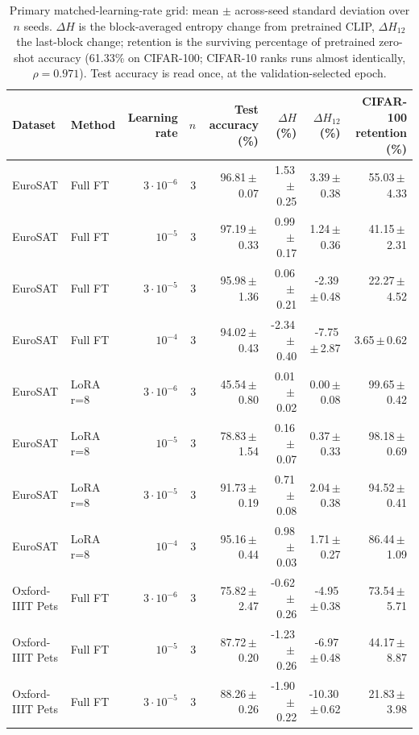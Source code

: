\documentclass[conference]{IEEEtran}
\begin{document}
\begin{table}[!t]
\caption{Primary matched-learning-rate grid: mean $\pm$ across-seed standard deviation over $n$ seeds. $\Delta H$ is the block-averaged entropy change from pretrained CLIP, $\Delta H_{12}$ the last-block change; retention is the surviving percentage of pretrained zero-shot accuracy (61.33\% on CIFAR-100; CIFAR-10 ranks runs almost identically, $\rho=0.971$). Test accuracy is read once, at the validation-selected epoch.}
\label{tab:grid}
\centering
\scriptsize
\setlength{\tabcolsep}{4pt}
\renewcommand{\arraystretch}{0.85}
\begin{tabular}{llrrrrrr}
\toprule
Dataset & Method & Learning rate & $n$ & Test accuracy (\%) & $\Delta H$ (\%) & $\Delta H_{12}$ (\%) & CIFAR-100 retention (\%) \\
\midrule
EuroSAT & Full FT & $3\cdot 10^{-6}$ & 3 & 96.81\,$\pm$\,0.07 & 1.53\,$\pm$\,0.25 & 3.39\,$\pm$\,0.38 & 55.03\,$\pm$\,4.33 \\
EuroSAT & Full FT & $10^{-5}$ & 3 & 97.19\,$\pm$\,0.33 & 0.99\,$\pm$\,0.17 & 1.24\,$\pm$\,0.36 & 41.15\,$\pm$\,2.31 \\
EuroSAT & Full FT & $3\cdot 10^{-5}$ & 3 & 95.98\,$\pm$\,1.36 & 0.06\,$\pm$\,0.21 & -2.39\,$\pm$\,0.48 & 22.27\,$\pm$\,4.52 \\
EuroSAT & Full FT & $10^{-4}$ & 3 & 94.02\,$\pm$\,0.43 & -2.34\,$\pm$\,0.40 & -7.75\,$\pm$\,2.87 & 3.65\,$\pm$\,0.62 \\
EuroSAT & LoRA r=8 & $3\cdot 10^{-6}$ & 3 & 45.54\,$\pm$\,0.80 & 0.01\,$\pm$\,0.02 & 0.00\,$\pm$\,0.08 & 99.65\,$\pm$\,0.42 \\
EuroSAT & LoRA r=8 & $10^{-5}$ & 3 & 78.83\,$\pm$\,1.54 & 0.16\,$\pm$\,0.07 & 0.37\,$\pm$\,0.33 & 98.18\,$\pm$\,0.69 \\
EuroSAT & LoRA r=8 & $3\cdot 10^{-5}$ & 3 & 91.73\,$\pm$\,0.19 & 0.71\,$\pm$\,0.08 & 2.04\,$\pm$\,0.38 & 94.52\,$\pm$\,0.41 \\
EuroSAT & LoRA r=8 & $10^{-4}$ & 3 & 95.16\,$\pm$\,0.44 & 0.98\,$\pm$\,0.03 & 1.71\,$\pm$\,0.27 & 86.44\,$\pm$\,1.09 \\
Oxford-IIIT Pets & Full FT & $3\cdot 10^{-6}$ & 3 & 75.82\,$\pm$\,2.47 & -0.62\,$\pm$\,0.26 & -4.95\,$\pm$\,0.38 & 73.54\,$\pm$\,5.71 \\
Oxford-IIIT Pets & Full FT & $10^{-5}$ & 3 & 87.72\,$\pm$\,0.20 & -1.23\,$\pm$\,0.26 & -6.97\,$\pm$\,0.48 & 44.17\,$\pm$\,8.87 \\
Oxford-IIIT Pets & Full FT & $3\cdot 10^{-5}$ & 3 & 88.26\,$\pm$\,0.26 & -1.90\,$\pm$\,0.22 & -10.30\,$\pm$\,0.62 & 21.83\,$\pm$\,3.98 \\

\end{tabular}
\end{table}
\end{document}

